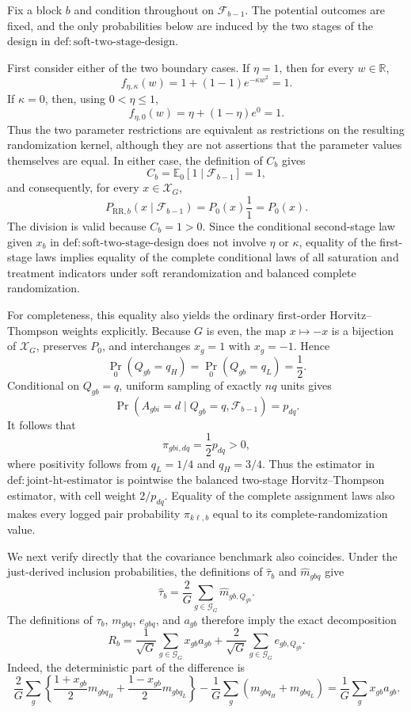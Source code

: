 Fix a block \(b\) and condition throughout on \(\mathcal F_{b-1}\).  The potential outcomes are fixed, and the only probabilities below are induced by the two stages of the design in \(\mathrm{def:soft\mbox{-}two\mbox{-}stage\mbox{-}design}\).

First consider either of the two boundary cases.  If \(\eta=1\), then for every \(w\in\mathbb R\),
\[
 f_{\eta,\kappa}(w)=1+(1-1)e^{-\kappa w^2}=1.
\]
If \(\kappa=0\), then, using \(0<\eta\leq1\),
\[
 f_{\eta,0}(w)=\eta+(1-\eta)e^0=1.
\]
Thus the two parameter restrictions are equivalent as restrictions on the resulting randomization kernel, although they are not assertions that the parameter values themselves are equal.  In either case, the definition of \(C_b\) gives
\[
 C_b=\mathbb E_0[1\mid\mathcal F_{b-1}]=1,
\]
and consequently, for every \(x\in\mathcal X_G\),
\[
 P_{\mathrm{RR},b}(x\mid\mathcal F_{b-1})
 =P_0(x)\frac{1}{1}=P_0(x).
\]
The division is valid because \(C_b=1>0\).  Since the conditional second-stage law given \(x_b\) in \(\mathrm{def:soft\mbox{-}two\mbox{-}stage\mbox{-}design}\) does not involve \(\eta\) or \(\kappa\), equality of the first-stage laws implies equality of the complete conditional laws of all saturation and treatment indicators under soft rerandomization and balanced complete randomization.

For completeness, this equality also yields the ordinary first-order Horvitz--Thompson weights explicitly.  Because \(G\) is even, the map \(x\mapsto-x\) is a bijection of \(\mathcal X_G\), preserves \(P_0\), and interchanges \(x_g=1\) with \(x_g=-1\).  Hence
\[
 \Pr_0(Q_{gb}=q_H)=\Pr_0(Q_{gb}=q_L)=\frac12.
\]
Conditional on \(Q_{gb}=q\), uniform sampling of exactly \(nq\) units gives
\[
 \Pr(A_{gbi}=d\mid Q_{gb}=q,\mathcal F_{b-1})=p_{dq}.
\]
It follows that
\[
 \pi_{gbi,dq}=\frac12p_{dq}>0,
\]
where positivity follows from \(q_L=1/4\) and \(q_H=3/4\).  Thus the estimator in \(\mathrm{def:joint\mbox{-}ht\mbox{-}estimator}\) is pointwise the balanced two-stage Horvitz--Thompson estimator, with cell weight \(2/p_{dq}\).  Equality of the complete assignment laws also makes every logged pair probability \(\pi_{k\ell,b}\) equal to its complete-randomization value.

We next verify directly that the covariance benchmark also coincides.  Under the just-derived inclusion probabilities, the definitions of \(\widehat\tau_b\) and \(\widehat m_{gbq}\) give
\[
 \widehat\tau_b=\frac2G\sum_{g\in\mathcal G_G}\widehat m_{gb,Q_{gb}}.
\]
The definitions of \(\tau_b\), \(m_{gbq}\), \(e_{gbq}\), and \(a_{gb}\) therefore imply the exact decomposition
\[
 R_b
 =\frac1{\sqrt G}\sum_{g\in\mathcal G_G}x_{gb}a_{gb}
  +\frac2{\sqrt G}\sum_{g\in\mathcal G_G}e_{gb,Q_{gb}}.
\tag{1}
\]
Indeed, the deterministic part of the difference is
\[
 \frac2G\sum_g\left\{\frac{1+x_{gb}}2m_{gbq_H}
 +\frac{1-x_{gb}}2m_{gbq_L}\right\}
 -\frac1G\sum_g(m_{gbq_H}+m_{gbq_L})
 =\frac1G\sum_gx_{gb}a_{gb}.
\]

